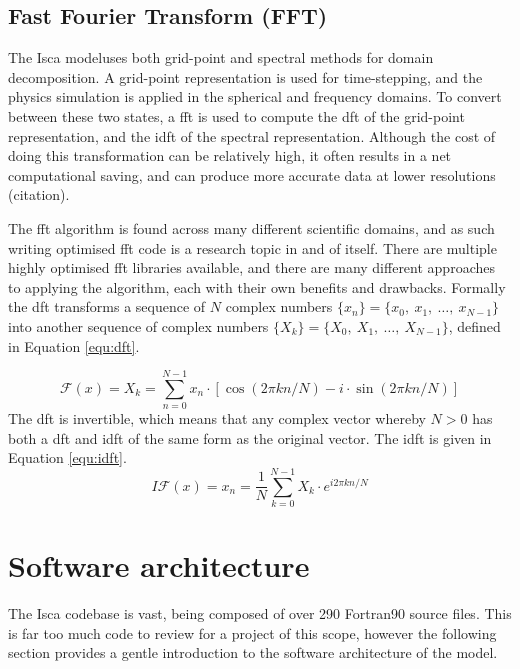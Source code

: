 \documentclass[a4paper,11pt]{report}
\begin{document}
\subsection{Fast Fourier Transform (FFT)}
The Isca modeluses both grid-point and spectral methods for domain decomposition. A grid-point representation is used for time-stepping, and the physics simulation is applied in the spherical and frequency domains. To convert between these two states, a \gls{fft} is used to compute the \gls{dft} of the grid-point representation, and the \gls{idft} of the spectral representation. Although the cost of doing this transformation can be relatively high, it often results in a net computational saving, and can produce more accurate data at lower resolutions (citation).
\par
The \gls{fft} algorithm is found across many different scientific domains, and as such writing optimised \gls{fft} code is a research topic in and of itself. There are multiple highly optimised \gls{fft} libraries available, and there are many different approaches to applying the algorithm, each with their own benefits and drawbacks. Formally the \gls{dft} transforms a sequence of $N$ complex numbers $\{x_{n}\} = \{ x_{0}, \: x_{1}, \: \ldots, \: x_{N-1} \}$ into another sequence of complex numbers $\{X_{k}\} = \{X_{0}, \: X_{1},  \: \ldots, \: X_{N-1} \}$, defined in Equation \ref{equ:dft}.

\begin{equation}
\label{equ:dft}
\mathcal{F}(x) = X_{k} = \sum _ { n = 0 } ^ { N - 1 } x _ { n } \cdot [ \cos ( 2 \pi k n / N ) - i \cdot \sin ( 2 \pi k n / N ) ]
\end{equation}
The \gls{dft} is invertible, which means that any complex vector whereby $N > 0$ has both a \gls{dft} and \gls{idft} of the same form as the original vector. The \gls{idft} is given in Equation \ref{equ:idft}.
\begin{equation}
\label{equ:idft}
I\mathcal{F}(x) = x _ { n } = \frac { 1 } { N } \sum _ { k = 0 } ^ { N - 1 } X _ { k } \cdot e ^ { i 2 \pi k n / N }
\end{equation}
\par

\section{Software architecture}
The Isca codebase is vast, being composed of over 290 Fortran90 source files. This is far too much code to review for a project of this scope, however the following section provides a gentle introduction to the software architecture of the model.
\end{document}
